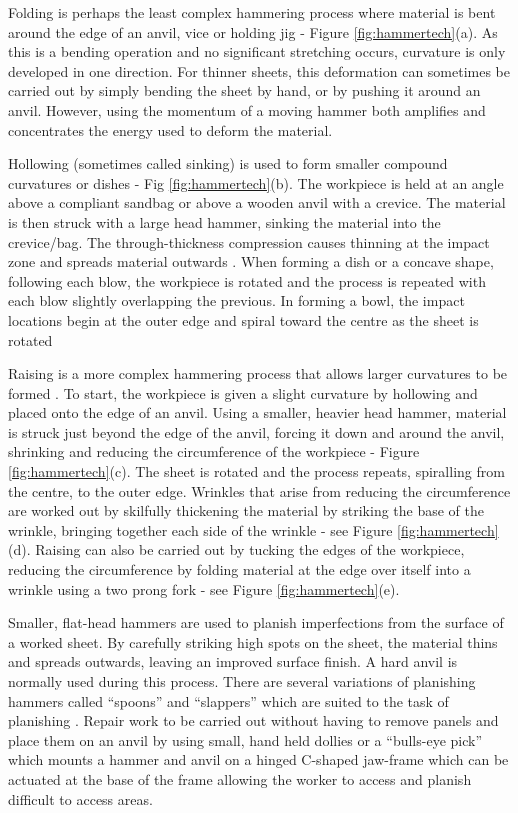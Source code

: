 Folding is perhaps the least complex hammering process where material is bent around the edge of an anvil, vice or holding jig - Figure \ref{fig:hammertech}(a). As this is a bending operation and no significant stretching occurs, curvature is only developed in one direction. For thinner sheets, this deformation can sometimes be carried out by simply bending the sheet by hand, or by pushing it around an anvil. However, using the momentum of a moving hammer both amplifies and concentrates the energy used to deform the material. 

Hollowing (sometimes called sinking) is used to form smaller compound curvatures or dishes - Fig \ref{fig:hammertech}(b). The workpiece is held at an angle above a compliant sandbag or above a wooden anvil with a crevice. The material is then struck with a large head hammer, sinking the material into the crevice/bag. The through-thickness compression causes thinning at the impact zone and spreads material outwards \citep{Music2012TheTools}. When forming a dish or a concave shape, following each blow, the workpiece is rotated and the process is repeated with each blow slightly overlapping the previous. In forming a bowl, the impact locations begin at the outer edge and spiral toward the centre as the sheet is rotated

Raising is a more complex hammering process that allows larger curvatures to be formed \citep{Livesey2019TheBodies}. To start, the workpiece is given a slight curvature by hollowing and placed onto the edge of an anvil. Using a smaller, heavier head hammer, material is struck just beyond the edge of the anvil, forcing it down and around the anvil, shrinking and reducing the circumference of the workpiece - Figure \ref{fig:hammertech}(c). The sheet is rotated and the process repeats, spiralling from the centre, to the outer edge. Wrinkles that arise from reducing the circumference are worked out by skilfully thickening the material by striking the base of the wrinkle, bringing together each side of the wrinkle - see Figure \ref{fig:hammertech}(d).  Raising can also be carried out by tucking the edges of the workpiece, reducing the circumference by folding material at the edge over itself into a wrinkle using a two prong fork - see Figure \ref{fig:hammertech}(e). 

Smaller, flat-head hammers are used to planish imperfections from the surface of a worked sheet. By carefully striking high spots on the sheet, the material thins and spreads outwards, leaving an improved surface finish. A hard anvil is normally used during this process. There are several variations of planishing hammers called ``spoons'' and ``slappers'' which are suited to the task of planishing \citep{Barr2013ProfessionalFabrication}. 
Repair work to be carried out without having to remove panels and place them on an anvil by using small, hand held dollies or a ``bulls-eye pick'' which mounts a hammer and anvil on a hinged C-shaped jaw-frame which can be actuated at the base of the frame allowing the worker to access and planish difficult to access areas.


